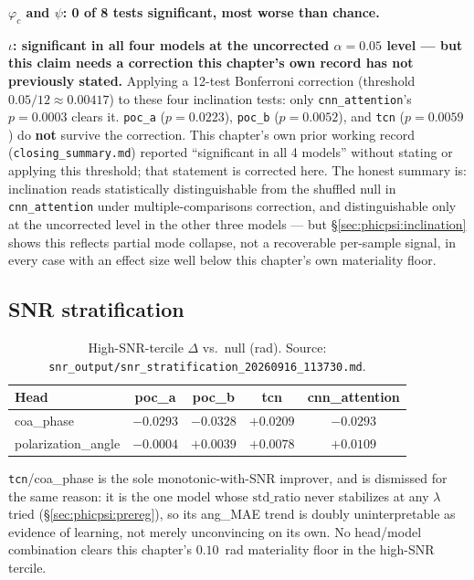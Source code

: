 \textbf{$\varphi_c$ and $\psi$: 0 of 8 tests significant, most worse than chance.}

\textbf{$\iota$: significant in all four models at the uncorrected $\alpha=0.05$ level --- but this claim needs a correction this chapter's own record has not previously stated.}
Applying a 12-test Bonferroni correction (threshold $0.05/12 \approx 0.00417$) to these four inclination tests: only \texttt{cnn\_attention}'s $p=0.0003$ clears it.
\texttt{poc\_a} ($p=0.0223$), \texttt{poc\_b} ($p=0.0052$), and \texttt{tcn} ($p=0.0059$) do \textbf{not} survive the correction.
This chapter's own prior working record (\texttt{closing\_summary.md}) reported ``significant in all 4 models'' without stating or applying this threshold; that statement is corrected here.
The honest summary is: inclination reads statistically distinguishable from the shuffled null in \texttt{cnn\_attention} under multiple-comparisons correction, and distinguishable only at the uncorrected level in the other three models --- but \S\ref{sec:phicpsi:inclination} shows this reflects partial mode collapse, not a recoverable per-sample signal, in every case with an effect size well below this chapter's own materiality floor.

\subsection{SNR stratification}
\label{sec:phicpsi:snr}

\begin{table}[tbp]
    \centering
    \caption{High-SNR-tercile $\Delta$ vs.\ null (rad). Source: \texttt{snr\_output/snr\_stratification\_20260916\_113730.md}.}
    \label{tab:phicpsi:redo:snr}
    \small
    \begin{tabular}{@{}lcccc@{}}
        \toprule
        Head & poc\_a & poc\_b & tcn & cnn\_attention \\
        \midrule
        coa\_phase & $-0.0293$ & $-0.0328$ & $\mathbf{+0.0209}$ & $-0.0293$ \\
        polarization\_angle & $-0.0004$ & $+0.0039$ & $+0.0078$ & $+0.0109$ \\
        \bottomrule
    \end{tabular}
\end{table}

\texttt{tcn}/coa\_phase is the sole monotonic-with-SNR improver, and is dismissed for the same reason: it is the one model whose $\text{std\_ratio}$ never stabilizes at any $\lambda$ tried (\S\ref{sec:phicpsi:prereg}), so its ang\_MAE trend is doubly uninterpretable as evidence of learning, not merely unconvincing on its own.
No head/model combination clears this chapter's $0.10$~rad materiality floor in the high-SNR tercile.

